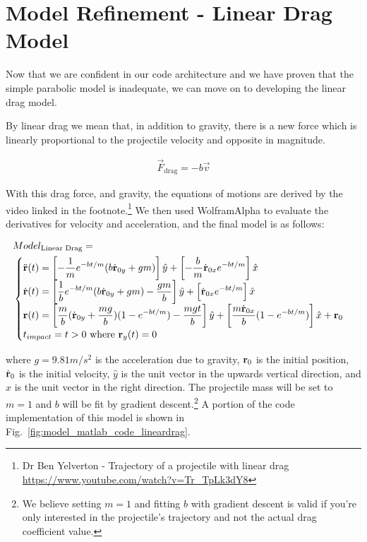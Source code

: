 \section{Model Refinement - Linear Drag Model}

Now that we are confident in our code architecture and we have proven that the simple parabolic model is inadequate, we can move on to developing the linear drag model. 

By linear drag we mean that, in addition to gravity, there is a new force which is linearly proportional to the projectile velocity and opposite in magnitude. 

\begin{align*}
\vec{F}_{\text{drag}} = -b\vec{v}
\end{align*}

With this drag force, and gravity, the equations of motions are derived by the video linked in the footnote.\footnote{Dr Ben Yelverton - Trajectory of a projectile with linear drag \href{https://www.youtube.com/watch?v=Tr\_TpLk3dY8}{https://www.youtube.com/watch?v=Tr\_TpLk3dY8}} We then used WolframAlpha to evaluate the derivatives for velocity and acceleration, and the final model is as follows:

\begin{align*}
&Model_{\text{Linear Drag}} = \\
&\begin{cases} 
\displaystyle \ddot{\bf r}(t) = \left[-\frac{1}{m}e^{-bt/m}(b\dot{\bf r}_{0y}+gm)\right]\hat{y} + \left[-\frac{b}{m}\dot{\bf r}_{0x}e^{-bt/m}\right]\hat{x} 
\\
\displaystyle \dot{\bf r}(t) = \left[\frac{1}{b}e^{-bt/m}(b\dot{\bf r}_{0y}+gm)-\frac{gm}{b}\right]\hat{y} + \left[\dot{\bf r}_{0x}e^{-bt/m}\right]\hat{x} 
\\
\displaystyle {\bf r}(t) = \left[\frac{m}{b}(\dot{\bf r}_{0y}+\frac{mg}{b})(1-e^{-bt/m})-\frac{mgt}{b}\right]\hat{y} + \left[\frac{m\dot{\bf r}_{0x}}{b}(1-e^{-bt/m})\right]\hat{x} + {\bf r}_0\\
t_{impact} = t > 0\text{ where }{\bf r}_y(t) = 0
\end{cases}
\end{align*}

where $g=9.81m/s^2$ is the acceleration due to gravity, ${\bf r}_0$ is the initial position, $\dot{\bf r}_0$ is the initial velocity, $\hat{y}$ is the unit vector in the upwards vertical direction, and $\hat{x}$ is the unit vector in the right direction. The projectile mass will be set to $m=1$ and $b$ will be fit by gradient descent.\footnote{We believe setting $m=1$ and fitting $b$ with gradient descent is valid if you're only interested in the projectile's trajectory and not the actual drag coefficient value.} A portion of the code implementation of this model is shown in Fig.~\ref{fig:model_matlab_code_lineardrag}.

